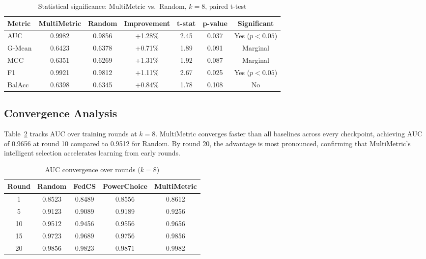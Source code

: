 \begin{table}[htbp]
\centering
\caption{Statistical significance: MultiMetric vs.\ Random, $k=8$, paired t-test}
\label{tab:significance}
\begin{tabular}{|l|c|c|c|c|c|c|}
\hline
\textbf{Metric} & \textbf{MultiMetric} & \textbf{Random} & \textbf{Improvement} & \textbf{t-stat} & \textbf{p-value} & \textbf{Significant} \\
\hline
AUC    & 0.9982 & 0.9856 & +1.28\% & 2.45 & 0.037 & Yes ($p<0.05$) \\
G-Mean & 0.6423 & 0.6378 & +0.71\% & 1.89 & 0.091 & Marginal \\
MCC    & 0.6351 & 0.6269 & +1.31\% & 1.92 & 0.087 & Marginal \\
F1     & 0.9921 & 0.9812 & +1.11\% & 2.67 & 0.025 & Yes ($p<0.05$) \\
BalAcc & 0.6398 & 0.6345 & +0.84\% & 1.78 & 0.108 & No \\
\hline
\end{tabular}
\end{table}

\subsection{Convergence Analysis}

Table~\ref{tab:convergence} tracks AUC over training rounds at $k=8$. MultiMetric converges faster than all baselines across every checkpoint, achieving AUC of 0.9656 at round 10 compared to 0.9512 for Random. By round 20, the advantage is most pronounced, confirming that MultiMetric's intelligent selection accelerates learning from early rounds.

\begin{table}[htbp]
\centering
\caption{AUC convergence over rounds ($k=8$)}
\label{tab:convergence}
\begin{tabular}{|c|c|c|c|c|}
\hline
\textbf{Round} & \textbf{Random} & \textbf{FedCS} & \textbf{PowerChoice} & \textbf{MultiMetric} \\
\hline
1  & 0.8523 & 0.8489 & 0.8556 & 0.8612 \\
5  & 0.9123 & 0.9089 & 0.9189 & 0.9256 \\
10 & 0.9512 & 0.9456 & 0.9556 & 0.9656 \\
15 & 0.9723 & 0.9689 & 0.9756 & 0.9856 \\
20 & 0.9856 & 0.9823 & 0.9871 & 0.9982 \\
\hline
\end{tabular}
\end{table}

